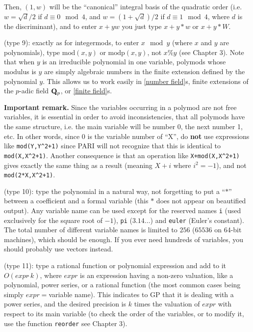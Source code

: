 Then, $(1,w)$ will be the ``canonical'' integral basis of the quadratic order
(i.e. $w=\sqrt{d}/2$ if $d\equiv 0 \mod 4$, and $w=(1+\sqrt{d})/2$ if
$d\equiv 1 \mod 4$, where $d$ is the discriminant), and to enter $x+yw$ you
just type $x+y*w$ or $x+y*W$.

 (type 9): exactly as for integermods,
to enter $x \mod y$ (where $x$ and $y$ are polynomials), type
$\text{mod}(x,y)$ or $\text{modp}(x,y)$, not $x\% y$ (see Chapter 3). Note that
when $y$ is an
irreducible polynomial in one variable, polymods whose modulus is $y$ are 
simply algebraic numbers in the finite extension defined by the polynomial $y$.
This allows us to work easily in \ref{number field}s, finite extensions of 
the $p$-adic field $\Bbb Q_p$, or \ref{finite field}s.

{\bf Important remark.} Since the variables occurring in a polymod are not
free variables, it is essential in order to avoid inconsistencies, that
all polymods have the same structure, i.e. the main variable will be number 0,
the next number 1, etc. In other words, since 0 is the variable number
of ``X'', do {\bf not} use expressions like {\tt mod(Y,Y\^{}2+1)} since PARI 
will not recognize that this is identical to {\tt mod(X,X\^{}2+1)}. Another 
consequence is that an operation like {\tt X+mod(X,X\^{}2+1)} gives exactly 
the same thing as a result (meaning $X+i$ where $i^2=-1$), and not 
{\tt mod(2*X,X\^{}2+1)}.

 (type 10): type the polynomial in a natural
way, not forgetting to put a ``$*$'' between a coefficient and a formal
variable (this $*$ does not appear on beautified output). Any variable name can be used
except for the reserved names {\tt i} (used exclusively for the square root
of $-1$), {\tt pi} ($3.14\dots$) and {\tt euler} (Euler's constant).
The total number of different variable names is limited to $256$ ($65536$
on 64-bit machines), which should be enough. If you ever need
hundreds of variables, you should probably use vectors instead.

\subsec{\ref{Power series}} (type 11): type a rational function or
polynomial expression and add to it $O(expr\hat{\ }k)$, where $expr$ is an
expression
having a non-zero valuation, like a polynomial, power series, or a
rational function (the most common cases being simply $expr=$variable name).
This indicates
to GP that it is dealing with a power series, and the desired precision
is $k$ times the valuation of $expr$ with respect to its main variable
(to check the order of the variables, or to modify it, use the function
{\tt reorder} see Chapter 3).

